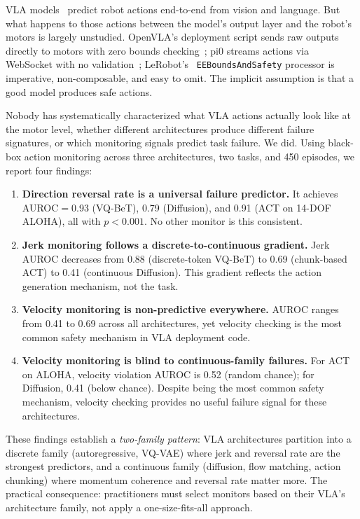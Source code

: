 \documentclass[conference]{IEEEtran}
\begin{document}
VLA models~\cite{rt2,openvla,smolvla} predict robot actions end-to-end from vision and language.
But what happens to those actions between the model's output layer and the robot's motors is largely unstudied.
OpenVLA's deployment script sends raw outputs directly to motors with zero bounds checking~\cite{openvla};
pi0 streams actions via WebSocket with no validation~\cite{pi0};
LeRobot's~\cite{lerobot} \texttt{EEBoundsAndSafety} processor is imperative, non-composable, and easy to omit.
The implicit assumption is that a good model produces safe actions.

Nobody has systematically characterized what VLA actions actually look like at the motor level, whether different architectures produce different failure signatures, or which monitoring signals predict task failure.
We did.
Using black-box action monitoring across three architectures, two tasks, and 450 episodes, we report four findings:

\begin{enumerate}
    \item \textbf{Direction reversal rate is a universal failure predictor.} It achieves AUROC${=}$0.93 (VQ-BeT), 0.79 (Diffusion), and 0.91 (ACT on 14-DOF ALOHA), all with $p < 0.001$. No other monitor is this consistent.
    \item \textbf{Jerk monitoring follows a discrete-to-continuous gradient.} Jerk AUROC decreases from 0.88 (discrete-token VQ-BeT) to 0.69 (chunk-based ACT) to 0.41 (continuous Diffusion). This gradient reflects the action generation mechanism, not the task.
    \item \textbf{Velocity monitoring is non-predictive everywhere.} AUROC ranges from 0.41 to 0.69 across all architectures, yet velocity checking is the most common safety mechanism in VLA deployment code.
    \item \textbf{Velocity monitoring is blind to continuous-family failures.} For ACT on ALOHA, velocity violation AUROC is 0.52 (random chance); for Diffusion, 0.41 (below chance). Despite being the most common safety mechanism, velocity checking provides no useful failure signal for these architectures.
\end{enumerate}

These findings establish a \emph{two-family pattern}: VLA architectures partition into a discrete family (autoregressive, VQ-VAE) where jerk and reversal rate are the strongest predictors, and a continuous family (diffusion, flow matching, action chunking) where momentum coherence and reversal rate matter more.
The practical consequence: practitioners must select monitors based on their VLA's architecture family, not apply a one-size-fits-all approach.
\end{document}
